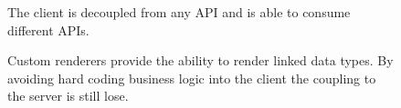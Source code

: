 \begin{figure}[!htb]
  \caption{The client is decoupled from any API and is able to consume different APIs.}
\end{figure}

\begin{figure}[!htb]
  \caption{Custom renderers provide the ability to render linked data types. By avoiding hard coding business logic into the client the coupling to the server is still lose.}
\end{figure}
